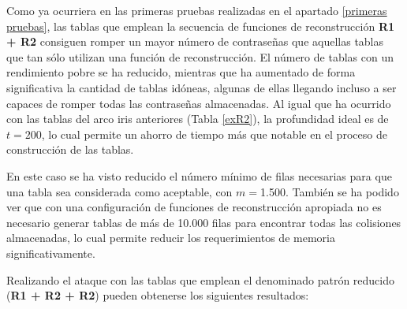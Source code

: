 \documentclass[12pt,spanish,listoffigures,listoftables,listofalgorithms]{tfgetsinf}
\begin{document}
Como ya ocurriera en las primeras pruebas realizadas en el apartado \ref{primeras pruebas}, las tablas que emplean la secuencia de funciones de reconstrucción \textbf{R1 + R2} consiguen romper un mayor número de contraseñas que aquellas tablas que tan sólo utilizan una función de reconstrucción. El número de tablas con un rendimiento pobre se ha reducido, mientras que ha aumentado de forma significativa la cantidad de tablas idóneas, algunas de ellas llegando incluso a ser capaces de romper todas las contraseñas almacenadas. Al igual que ha ocurrido con las tablas del arco iris anteriores (Tabla \ref{exR2}), la profundidad ideal es de $t = 200$, lo cual permite un ahorro de tiempo más que notable en el proceso de construcción de las tablas.

En este caso se ha visto reducido el número mínimo de filas necesarias para que una tabla sea considerada como aceptable, con $m = $1.500. También se ha podido ver que con una configuración de funciones de reconstrucción apropiada no es necesario generar tablas de más de 10.000 filas para encontrar todas las colisiones almacenadas, lo cual permite reducir los requerimientos de memoria significativamente.

Realizando el ataque con las tablas que emplean el denominado patrón reducido (\textbf{R1 + R2 + R2}) pueden obtenerse los siguientes resultados:
\end{document}
